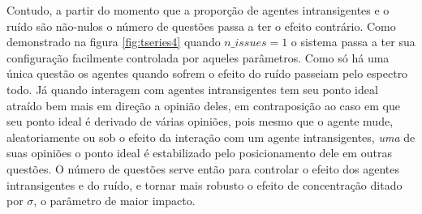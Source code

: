     Contudo, a partir do momento que a proporção de agentes intransigentes e o
    ruído são não-nulos o número de questões passa a ter o efeito contrário.
    Como demonstrado na figura \ref{fig:tseries4} quando \(n\_issues = 1\) o
    sistema passa a ter sua configuração facilmente controlada por aqueles
    parâmetros. Como só há uma única questão os agentes quando sofrem o efeito
    do ruído passeiam pelo espectro todo. Já quando interagem com agentes
    intransigentes tem seu ponto ideal atraído bem mais em direção a opinião
    deles, em contraposição ao caso em que seu ponto ideal é derivado de várias
    opiniões, pois mesmo que o agente mude, aleatoriamente ou sob o efeito da
    interação com um agente intransigentes, \textit{uma} de suas opiniões o
    ponto ideal é estabilizado pelo posicionamento dele em outras questões. O
    número de questões serve então para controlar o efeito dos agentes
    intransigentes e do ruído, e tornar mais robusto o efeito de concentração
    ditado por \(\sigma\), o parâmetro de maior impacto.




